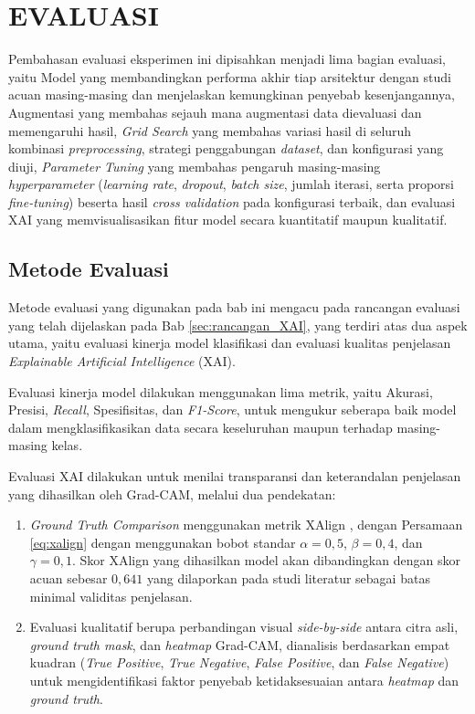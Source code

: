 \cleardoublepage
\chapter{EVALUASI}
\label{chap:evaluasi}
Pembahasan evaluasi eksperimen ini dipisahkan menjadi lima bagian evaluasi, yaitu Model yang membandingkan performa akhir tiap arsitektur dengan studi acuan masing-masing dan menjelaskan kemungkinan penyebab kesenjangannya, Augmentasi yang membahas sejauh mana augmentasi data dievaluasi dan memengaruhi hasil, \textit{Grid Search} yang membahas variasi hasil di seluruh kombinasi \textit{preprocessing}, strategi penggabungan \textit{dataset}, dan konfigurasi yang diuji, \textit{Parameter Tuning} yang membahas pengaruh masing-masing \textit{hyperparameter} (\textit{learning rate}, \textit{dropout}, \textit{batch size}, jumlah iterasi, serta proporsi \textit{fine-tuning}) beserta hasil \textit{cross validation} pada konfigurasi terbaik, dan evaluasi XAI yang memvisualisasikan fitur model secara kuantitatif maupun kualitatif.

\section{Metode Evaluasi}
Metode evaluasi yang digunakan pada bab ini mengacu pada rancangan evaluasi yang telah dijelaskan pada Bab \ref{sec:rancangan_XAI}, yang terdiri atas dua aspek utama, yaitu evaluasi kinerja model klasifikasi dan evaluasi kualitas penjelasan \textit{Explainable Artificial Intelligence} (XAI).

Evaluasi kinerja model dilakukan menggunakan lima metrik, yaitu Akurasi, Presisi, \textit{Recall}, Spesifisitas, dan \textit{F1-Score}, untuk mengukur seberapa baik model dalam mengklasifikasikan data secara keseluruhan maupun terhadap masing-masing kelas.

Evaluasi XAI dilakukan untuk menilai transparansi dan keterandalan penjelasan yang dihasilkan oleh Grad-CAM, melalui dua pendekatan:
\begin{enumerate}
	\item \textit{Ground Truth Comparison} menggunakan metrik XAlign \autocite{muhammad2025heatmap}, dengan Persamaan \ref{eq:xalign} dengan menggunakan bobot standar $\alpha=0,5$, $\beta=0,4$, dan $\gamma=0,1$. Skor XAlign yang dihasilkan model akan dibandingkan dengan skor acuan sebesar $0,641$ yang dilaporkan pada studi literatur sebagai batas minimal validitas penjelasan.
	\item Evaluasi kualitatif berupa perbandingan visual \textit{side-by-side} antara citra asli, \textit{ground truth mask}, dan \textit{heatmap} Grad-CAM, dianalisis berdasarkan empat kuadran (\textit{True Positive}, \textit{True Negative}, \textit{False Positive}, dan \textit{False Negative}) untuk mengidentifikasi faktor penyebab ketidaksesuaian antara \textit{heatmap} dan \textit{ground truth}.
\end{enumerate}

